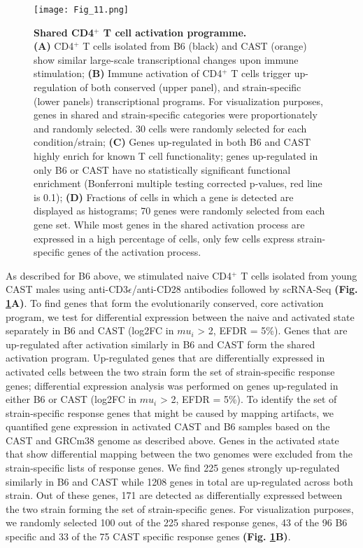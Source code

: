 \begin{figure}[!ht]
\centering
\texttt{[image: Fig\_11.png]}
\caption[Shared CD4$^+$ T cell activation programme]{\textbf{Shared CD4$^+$ T cell activation programme.}\\
\textbf{(A)} CD4$^+$ T cells isolated from B6 (black) and CAST (orange) show similar large-scale transcriptional changes upon immune stimulation; \textbf{(B)} Immune activation of CD4$^+$ T cells trigger up-regulation of both conserved (upper panel), and strain-specific (lower panels) transcriptional programs. For visualization purposes, genes in shared and strain-specific categories were proportionately and randomly selected. 30 cells were randomly selected for each condition/strain; \textbf{(C)} Genes up-regulated in both B6 and CAST highly enrich for known T cell functionality; genes up-regulated in only B6 or CAST have no statistically significant functional enrichment (Bonferroni multiple testing corrected p-values, red line is 0.1); \textbf{(D)} Fractions of cells in which a gene is detected are displayed as histograms; 70 genes were randomly selected from each gene set. While most genes in the shared activation process are expressed in a high percentage of cells, only few cells express strain-specific genes of the activation process.}
\label{fig1:shared_activation}
\end{figure}


As described for B6 above, we stimulated naive CD4$^+$ T cells isolated from young CAST males using anti-CD3$\epsilon$/anti-CD28 antibodies followed by scRNA-Seq \textbf{(Fig. \ref{fig1:shared_activation}A)}. To find genes that form the evolutionarily conserved, core activation program, we test for differential expression between the naive and activated state separately in B6 and CAST (log2FC in $mu_i$ > 2, EFDR = 5\%). Genes that are up-regulated after activation similarly in B6 and CAST form the shared activation program. Up-regulated genes that are differentially expressed in activated cells between the two strain form the set of strain-specific response genes; differential expression analysis was performed on genes up-regulated in either B6 or CAST (log2FC in $mu_i$ > 2, EFDR = 5\%). To identify the set of strain-specific response genes that might be caused by mapping artifacts, we quantified gene expression in activated CAST and B6 samples based on the CAST and GRCm38 genome as described above. Genes in the activated state that show differential mapping between the two genomes were excluded from the strain-specific lists of response genes. We find 225 genes strongly up-regulated similarly in B6 and CAST while 1208 genes in total are up-regulated across both strain. Out of these genes, 171 are detected as differentially expressed between the two strain forming the set of strain-specific genes. For visualization purposes, we randomly selected 100 out of the 225 shared response genes, 43 of the 96 B6 specific and 33 of the 75 CAST specific response genes \textbf{(Fig. \ref{fig1:shared_activation}B)}.\\

